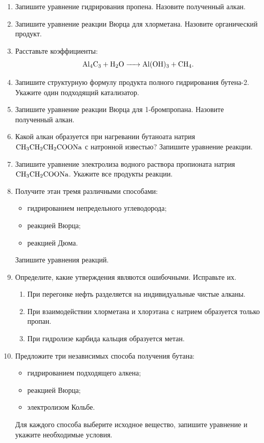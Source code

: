 \documentclass[a4paper,12pt]{article}
\begin{document}
\begin{enumerate}
    \item Запишите уравнение гидрирования пропена. Назовите полученный алкан.

    \item Запишите уравнение реакции Вюрца для хлорметана.
    Назовите органический продукт.

    \item Расставьте коэффициенты:
    \[
        \ce{Al4C3 + H2O -> Al(OH)3 + CH4}.
    \]

    \item Запишите структурную формулу продукта полного гидрирования
    бутена-2. Укажите один подходящий катализатор.

    \item Запишите уравнение реакции Вюрца для 1-бромпропана.
    Назовите полученный алкан.

    \item Какой алкан образуется при нагревании бутаноата натрия
    \(\ce{CH3CH2CH2COONa}\) с натронной известью?
    Запишите уравнение реакции.

    \item Запишите уравнение электролиза водного раствора пропионата натрия
    \(\ce{CH3CH2COONa}\). Укажите все продукты реакции.

    \item Получите этан тремя различными способами:
    \begin{itemize}
        \item гидрированием непредельного углеводорода;
        \item реакцией Вюрца;
        \item реакцией Дюма.
    \end{itemize}
    Запишите уравнения реакций.

    \item Определите, какие утверждения являются ошибочными. Исправьте их.
    \begin{enumerate}[label=\alph*)]
        \item При перегонке нефть разделяется на индивидуальные чистые алканы.
        \item При взаимодействии хлорметана и хлорэтана с натрием
        образуется только пропан.
        \item При гидролизе карбида кальция образуется метан.
    \end{enumerate}

    \item Предложите три независимых способа получения бутана:
    \begin{itemize}
        \item гидрированием подходящего алкена;
        \item реакцией Вюрца;
        \item электролизом Кольбе.
    \end{itemize}
    Для каждого способа выберите исходное вещество, запишите уравнение
    и укажите необходимые условия.
\end{enumerate}
\end{document}
